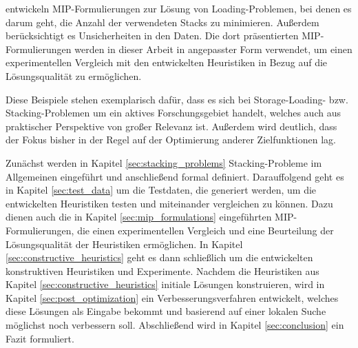 \citet{Le2016} entwickeln MIP-Formulierungen zur Lösung von Loading-Problemen, bei denen es darum geht,
die Anzahl der verwendeten Stacks zu minimieren. Außerdem berücksichtigt es Unsicherheiten in den Daten.
Die dort präsentierten MIP-Formulierungen werden in dieser Arbeit in angepasster Form verwendet,
um einen experimentellen Vergleich mit den entwickelten Heuristiken in Bezug auf die Lösungsqualität zu ermöglichen.

Diese Beispiele stehen exemplarisch dafür, dass es sich bei Storage-Loading- bzw. Stacking-Problemen um
ein aktives Forschungsgebiet handelt, welches auch aus praktischer Perspektive von großer Relevanz ist.
Außerdem wird deutlich, dass der Fokus bisher in der Regel auf der Optimierung anderer Zielfunktionen lag.

Zunächst werden in Kapitel \ref{sec:stacking_problems} Stacking-Probleme im Allgemeinen eingeführt und anschließend formal definiert.
Da­r­auf­fol­gend geht es in Kapitel \ref{sec:test_data} um die Testdaten, die generiert werden, um die entwickelten Heuristiken testen
und miteinander vergleichen zu können. Dazu dienen auch die in Kapitel \ref{sec:mip_formulations} eingeführten MIP-Formulierungen,
die einen experimentellen Vergleich und eine Beurteilung der Lösungsqualität der Heuristiken ermöglichen. In Kapitel \ref{sec:constructive_heuristics} geht es dann schließlich um die entwickelten konstruktiven Heuristiken und Experimente.
Nachdem die Heuristiken aus Kapitel \ref{sec:constructive_heuristics} initiale Lösungen konstruieren, wird in Kapitel
\ref{sec:post_optimization} ein Verbesserungsverfahren entwickelt, welches diese Lösungen als Eingabe bekommt
und basierend auf einer lokalen Suche möglichst noch verbessern soll.
Abschließend wird in Kapitel \ref{sec:conclusion} ein Fazit formuliert.

\pagebreak

